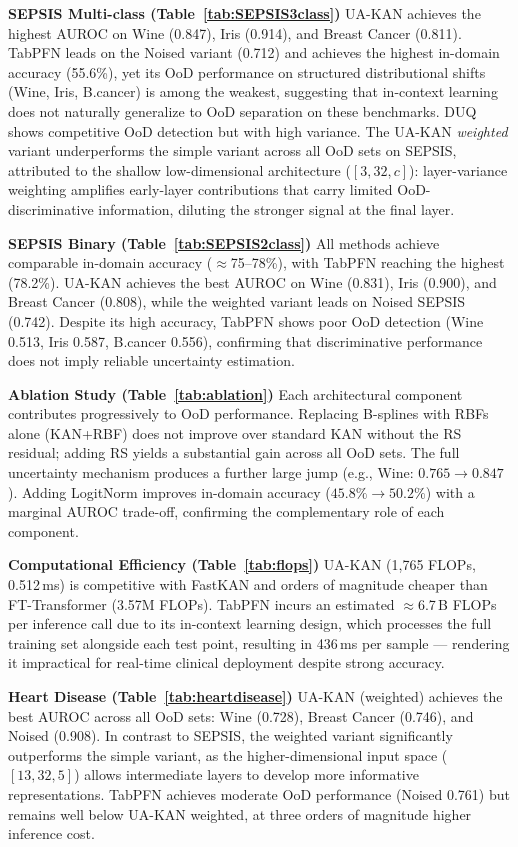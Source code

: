 \documentclass[conference]{IEEEtran}
\begin{document}
\noindent \textbf{SEPSIS Multi-class (Table~\ref{tab:SEPSIS3class})} UA-KAN achieves the highest AUROC on Wine (0.847), Iris (0.914), and Breast Cancer (0.811). TabPFN leads on the Noised variant (0.712) and achieves the highest in-domain accuracy (55.6\%), yet its OoD performance on structured distributional shifts (Wine, Iris, B.cancer) is among the weakest, suggesting that in-context learning does not naturally generalize to OoD separation on these benchmarks. DUQ shows competitive OoD detection but with high variance. The UA-KAN \textit{weighted} variant underperforms the simple variant across all OoD sets on SEPSIS, attributed to the shallow low-dimensional architecture ($[3, 32, c]$): layer-variance weighting amplifies early-layer contributions that carry limited OoD-discriminative information, diluting the stronger signal at the final layer.

\noindent \textbf{SEPSIS Binary (Table~\ref{tab:SEPSIS2class})} All methods achieve comparable in-domain accuracy ($\approx$75--78\%), with TabPFN reaching the highest (78.2\%). UA-KAN achieves the best AUROC on Wine (0.831), Iris (0.900), and Breast Cancer (0.808), while the weighted variant leads on Noised SEPSIS (0.742). Despite its high accuracy, TabPFN shows poor OoD detection (Wine 0.513, Iris 0.587, B.cancer 0.556), confirming that discriminative performance does not imply reliable uncertainty estimation.

\noindent \textbf{Ablation Study (Table~\ref{tab:ablation})} Each architectural component contributes progressively to OoD performance. Replacing B-splines with RBFs alone (KAN+RBF) does not improve over standard KAN without the RS residual; adding RS yields a substantial gain across all OoD sets. The full uncertainty mechanism produces a further large jump (e.g., Wine: $0.765 \to 0.847$). Adding LogitNorm improves in-domain accuracy ($45.8\% \to 50.2\%$) with a marginal AUROC trade-off, confirming the complementary role of each component.

\noindent \textbf{Computational Efficiency (Table~\ref{tab:flops})} UA-KAN (1{,}765 FLOPs, 0.512\,ms) is competitive with FastKAN and orders of magnitude cheaper than FT-Transformer (3.57M FLOPs). TabPFN incurs an estimated $\approx$6.7\,B FLOPs per inference call due to its in-context learning design, which processes the full training set alongside each test point, resulting in 436\,ms per sample — rendering it impractical for real-time clinical deployment despite strong accuracy.

\noindent \textbf{Heart Disease (Table~\ref{tab:heartdisease})} UA-KAN (weighted) achieves the best AUROC across all OoD sets: Wine (0.728), Breast Cancer (0.746), and Noised (0.908). In contrast to SEPSIS, the weighted variant significantly outperforms the simple variant, as the higher-dimensional input space ($[13,32,5]$) allows intermediate layers to develop more informative representations. TabPFN achieves moderate OoD performance (Noised 0.761) but remains well below UA-KAN weighted, at three orders of magnitude higher inference cost.
\end{document}
